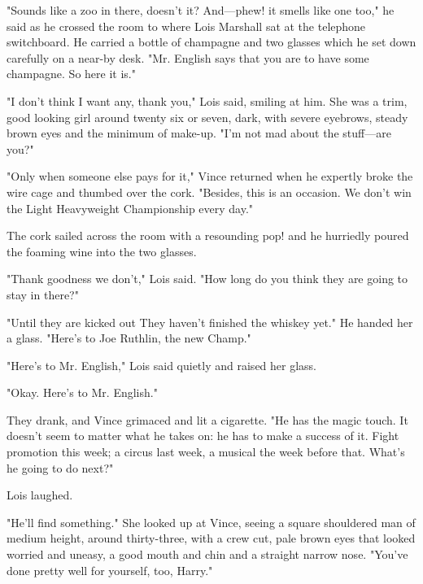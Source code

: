 \documentclass{novel}
\begin{document}
\mainmatter
\cleartorecto
\thispagestyle{empty}


\begin{ChapterStart}
\vspace{3\nbs}
\end{ChapterStart}
    
"Sounds like a zoo in there, doesn't it? And—phew! it smells like one too," he said as he crossed the room to where Lois Marshall sat at the telephone switchboard. He carried a bottle of champagne and two glasses which he set down carefully on a near-by desk. "Mr. English says that you are to have some champagne. So here it is."

"I don't think I want any, thank you," Lois said, smiling at him. She was a trim, good looking girl around twenty six or seven, dark, with severe eyebrows, steady brown eyes and the minimum of make-up. "I'm not mad about the stuff—are you?"

"Only when someone else pays for it," Vince returned when he expertly broke the wire cage and thumbed over the cork. "Besides, this is an occasion. We don't win the Light Heavyweight Championship every day."

The cork sailed across the room with a resounding pop! and he hurriedly poured the foaming wine into the two glasses.

"Thank goodness we don't," Lois said. "How long do you think they are going to stay in there?"

"Until they are kicked out They haven't finished the whiskey yet." He handed her a glass. "Here's to Joe Ruthlin, the new Champ."

"Here's to Mr. English," Lois said quietly and raised her glass.

"Okay. Here's to Mr. English."

They drank, and Vince grimaced and lit a cigarette. "He has the magic touch. It doesn't seem to matter what he takes on: he has to make a success of it. Fight promotion this week; a circus last week, a musical the week before that. What's he going to do next?"

Lois laughed.

"He'll find something." She looked up at Vince, seeing a square shouldered man of medium height, around thirty-three, with a crew cut, pale brown eyes that looked worried and uneasy, a good mouth and chin and a straight narrow nose. "You've done pretty well for yourself, too, Harry."
\end{document}
